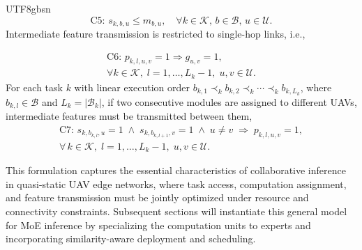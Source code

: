 \documentclass[journal]{IEEEtran}
\begin{document}
\begin{CJK*}{UTF8}{gbsn}
\begin{equation}
\text{C5: } s_{k,b,u} \le m_{b,u}, \quad \forall k \in \mathcal{K}, \, b \in \mathcal{B}, \, u \in \mathcal{U}.
\end{equation}
Intermediate feature transmission is restricted to single-hop links, i.e., 
%

\begin{multline}
\text{C6: } p_{k,l,u,v}=1 \Rightarrow g_{u,v}=1,\\
\forall k\in\mathcal{K},\; l=1,\ldots,L_k-1,\; u,v\in\mathcal{U}.
\end{multline}
For each task \(k\) with linear execution order \(b_{k,1} \prec_k b_{k,2} \prec_k \cdots \prec_k b_{k,L_k}\), where \(b_{k,l} \in \mathcal{B}\) and \(L_k = |\mathcal{B}_k|\), if two consecutive modules are assigned to different UAVs, intermediate features must be transmitted between them,
\begin{multline}
\text{C7: } s_{k,b_{k,l},u}\!=\!1 \;\land\; s_{k,b_{k,l+1},v}\!=\!1
\;\land\; u\neq v \;\Longrightarrow\; p_{k,l,u,v}\!=\!1,\\[2pt]
\forall\,k\in\mathcal{K},\; l\!=\!1,\ldots,L_k-1,\; u,v\in\mathcal{U}.
\label{eq:p_s_coupling}
\end{multline}


This formulation captures the essential characteristics of collaborative inference in quasi-static UAV edge networks, where task access, computation assignment, and feature transmission must be jointly optimized under resource and connectivity constraints. Subsequent sections will instantiate this general model for MoE inference by specializing the computation units to experts and incorporating similarity-aware deployment and scheduling.


\end{CJK*}
\end{document}
